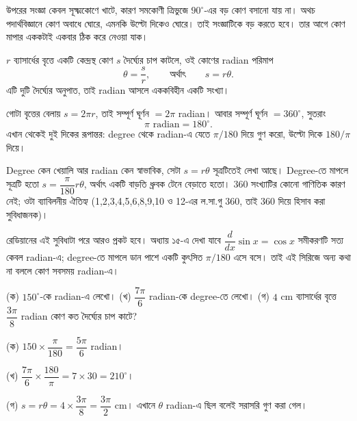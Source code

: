 \documentclass[11pt]{article}
\begin{document}
উপরের সংজ্ঞা কেবল সূক্ষ্মকোণে খাটে, কারণ সমকোণী ত্রিভুজে $90^\circ$-এর বড় কোণ
বসানো যায় না। অথচ পদার্থবিজ্ঞানে কোণ অবাধে ঘোরে, এমনকি উল্টো দিকেও ঘোরে। তাই
সংজ্ঞাটিকে বড় করতে হবে। তার আগে কোণ মাপার এককটাই একবার ঠিক করে নেওয়া যাক।

\begin{idea}[রেডিয়ান]
$r$ ব্যাসার্ধের বৃত্তে একটি কেন্দ্রস্থ কোণ $s$ দৈর্ঘ্যের চাপ কাটলে, ওই কোণের
radian পরিমাপ
\[
  \theta = \frac{s}{r}, \qquad \text{অর্থাৎ} \qquad s = r\theta .
\]
এটি দুটি দৈর্ঘ্যের অনুপাত, তাই radian আসলে এককবিহীন একটি সংখ্যা।

গোটা বৃত্তের বেলায় $s = 2\pi r$, তাই সম্পূর্ণ ঘূর্ণন $= 2\pi$ radian। আবার
সম্পূর্ণ ঘূর্ণন $= 360^\circ$, সুতরাং
\[
  \pi \text{ radian} = 180^\circ .
\]
এখান থেকেই দুই দিকের রূপান্তর: degree থেকে radian-এ যেতে $\pi/180$ দিয়ে গুণ
করো, উল্টো দিকে $180/\pi$ দিয়ে।
\end{idea}

\begin{remark}
Degree কেন খেয়ালি আর radian কেন স্বাভাবিক, সেটা $s = r\theta$ সূত্রটিতেই লেখা
আছে। Degree-তে মাপলে সূত্রটি হতো $s = \dfrac{\pi}{180} r\theta$, অর্থাৎ একটি
বাড়তি ধ্রুবক টেনে বেড়াতে হতো। $360$ সংখ্যাটির কোনো গাণিতিক কারণ নেই; ওটা
ব্যাবিলনীয় ঐতিহ্য (1,2,3,4,5,6,8,9,10 ও 12-এর ল.সা.গু 360, তাই 360 দিয়ে হিসাব করা সুবিধাজনক)।

রেডিয়ানের এই সুবিধাটা পরে আরও প্রকট হবে। অধ্যায় ১৫-এ দেখা যাবে $\dfrac{d}{dx}\sin x
= \cos x$ সমীকরণটি সত্য কেবল radian-এ; degree-তে মাপলে ডান পাশে একটি কুৎসিত
$\pi/180$ এসে বসে। তাই এই সিরিজে অন্য কথা না বললে কোণ সবসময় radian-এ।
\end{remark}

\begin{example}
(ক) $150^\circ$-কে radian-এ লেখো। (খ) $\dfrac{7\pi}{6}$ radian-কে degree-তে
লেখো। (গ) $4$ cm ব্যাসার্ধের বৃত্তে $\dfrac{3\pi}{8}$ radian কোণ কত দৈর্ঘ্যের
চাপ কাটে?
\end{example}

\begin{solbox}
(ক) $150 \times \dfrac{\pi}{180} = \dfrac{5\pi}{6}$ radian।

(খ) $\dfrac{7\pi}{6} \times \dfrac{180}{\pi} = 7 \times 30 = 210^\circ$।

(গ) $s = r\theta = 4 \times \dfrac{3\pi}{8} = \dfrac{3\pi}{2}$ cm।
এখানে $\theta$ radian-এ ছিল বলেই সরাসরি গুণ করা গেল।
\end{solbox}
\end{document}
